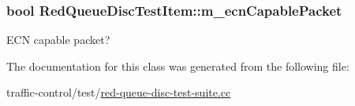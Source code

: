 \subsubsection[{\texorpdfstring{m\+\_\+ecn\+Capable\+Packet}{m_ecnCapablePacket}}]{\setlength{\rightskip}{0pt plus 5cm}bool Red\+Queue\+Disc\+Test\+Item\+::m\+\_\+ecn\+Capable\+Packet\hspace{0.3cm}{\ttfamily [private]}}\hypertarget{classRedQueueDiscTestItem_abeda20cb4e6e80f08432ab036cbec0af}{}\label{classRedQueueDiscTestItem_abeda20cb4e6e80f08432ab036cbec0af}


E\+CN capable packet? 



The documentation for this class was generated from the following file\+:\begin{DoxyCompactItemize}
\item 
traffic-\/control/test/\hyperlink{red-queue-disc-test-suite_8cc}{red-\/queue-\/disc-\/test-\/suite.\+cc}\end{DoxyCompactItemize}
